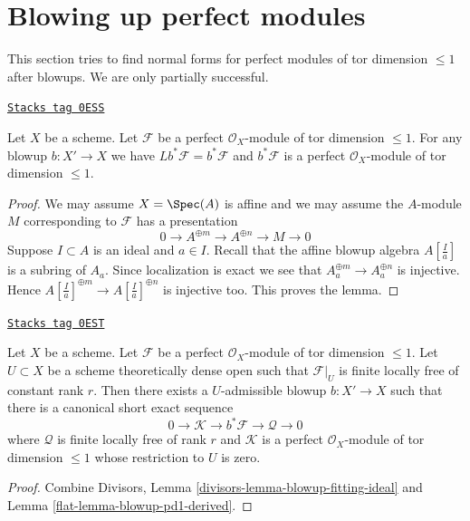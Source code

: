 \section{Blowing up perfect modules}
\label{flat-section-blowup-perfect-modules}
This section tries to find normal forms for perfect modules of tor dimension
$\leq 1$ after blowups. We are only partially successful.

\begin{lemma}
\label{flat-lemma-blowup-pd1-derived}
\href{https://stacks.math.columbia.edu/tag/0ESS}{\texttt{Stacks tag 0ESS}}

Let $X$ be a scheme. Let $\mathcal{F}$ be a perfect
$\mathcal{O}_X$-module of tor dimension $\leq 1$. For any
blowup $b : X' \to X$ we have $Lb^*\mathcal{F} = b^*\mathcal{F}$
and $b^*\mathcal{F}$ is a perfect $\mathcal{O}_X$-module
of tor dimension $\leq 1$.
\end{lemma}

\begin{proof}
We may assume $X = \Spec(A)$ is affine and we may assume the $A$-module $M$
corresponding to $\mathcal{F}$ has a presentation
$$
0 \to A^{\oplus m} \to A^{\oplus n} \to M \to 0
$$
Suppose $I \subset A$ is an ideal and $a \in I$. Recall that the
affine blowup algebra $A[\frac{I}{a}]$ is a subring of $A_a$.
Since localization is exact we see that $A_a^{\oplus m} \to A_a^{\oplus n}$
is injective. Hence $A[\frac{I}{a}]^{\oplus m} \to A[\frac{I}{a}]^{\oplus n}$
is injective too. This proves the lemma.
\end{proof}

\begin{lemma}[Blowup pd1]
\label{flat-lemma-blowup-pd1}
\href{https://stacks.math.columbia.edu/tag/0EST}{\texttt{Stacks tag 0EST}}

Let $X$ be a scheme. Let $\mathcal{F}$ be a perfect $\mathcal{O}_X$-module
of tor dimension $\leq 1$. Let $U \subset X$ be a scheme theoretically
dense open such that $\mathcal{F}|_U$ is finite locally free of constant
rank $r$. Then there exists a $U$-admissible blowup $b : X' \to X$ such that
there is a canonical short exact sequence
$$
0 \to \mathcal{K} \to b^*\mathcal{F} \to \mathcal{Q} \to 0
$$
where $\mathcal{Q}$ is finite locally free of rank $r$ and
$\mathcal{K}$ is a perfect $\mathcal{O}_X$-module
of tor dimension $\leq 1$ whose restriction to $U$ is zero.
\end{lemma}

\begin{proof}

Combine Divisors, Lemma \ref{divisors-lemma-blowup-fitting-ideal} and
Lemma \ref{flat-lemma-blowup-pd1-derived}.
\end{proof}

